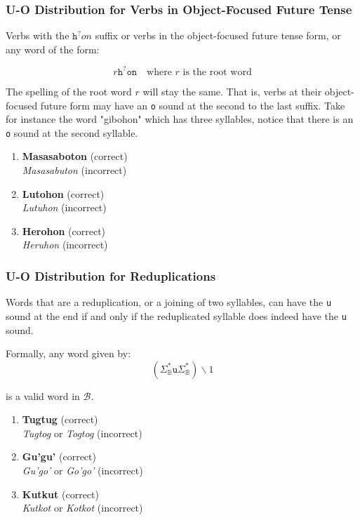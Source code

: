 \subsubsection{U-O Distribution for Verbs in Object-Focused Future Tense}

Verbs with the $\texttt{h}^?on$ suffix or verbs in the object-focused future tense form, or any word of the form:

\[
      r \texttt{h}^? \texttt{on} \quad \text{where } r \text{ is the root word}
\]

The spelling of the root word $r$ will stay the same. That is, verbs at their object-focused future form may have an \texttt{o} sound at the second to the last suffix. Take for instance the word "gibohon" which has three syllables, notice that there is an \texttt{o} sound at the second syllable.

\begin{example}
\end{example}

\begin{enumerate}
      \item \textbf{Masasaboton} (correct) \\
            \textit{Masasabuton} (incorrect)
      \item \textbf{Lutohon} (correct) \\
            \textit{Lutuhon} (incorrect)
      \item \textbf{Herohon} (correct) \\
            \textit{Heruhon} (incorrect)
\end{enumerate}

\subsubsection{U-O Distribution for Reduplications}

Words that are a reduplication, or a joining of two syllables, can have the \texttt{u} sound at the end if and only if the reduplicated syllable does indeed have the \texttt{u} sound.

Formally, any word given by:
\[
      \left( \Sigma_\mathbb{B}^*\texttt{u}\Sigma_\mathbb{B}^* \right)\backslash1
\]

is a valid word in $\mathcal{B}$.

\begin{example}

\end{example}

\begin{enumerate}
      \item \textbf{Tugtug} (correct) \\
            \textit{Tugtog} or \textit{Togtog} (incorrect)
      \item \textbf{Gu'gu'} (correct)
            \\ \textit{Gu'go'} or \textit{Go'go'} (incorrect)
      \item \textbf{Kutkut} (correct)
            \\ \textit{Kutkot} or \textit{Kotkot} (incorrect)
\end{enumerate}


